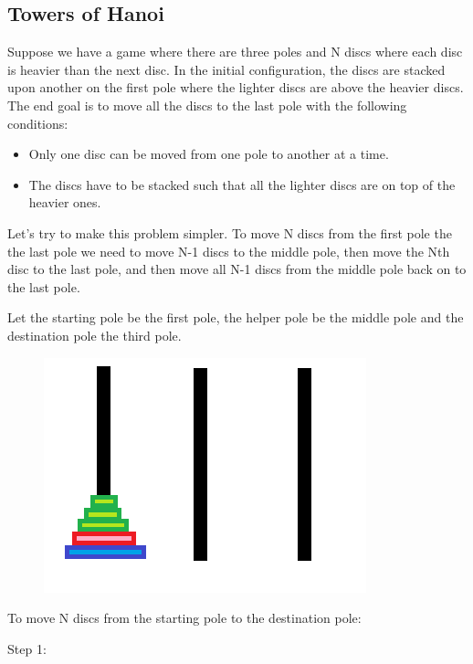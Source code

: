 \documentclass[11pt,oneside]{book}
\makeatletter
\def\maxwidth#1{\ifdim\Gin@nat@width>#1 #1\else\Gin@nat@width\fi}
\makeatother
\begin{document}
\subsection{Towers of Hanoi}

Suppose we have a game where there are three poles and N discs where each disc is heavier than the next disc. In the initial configuration, the discs are stacked upon another on the first pole where the lighter discs are above the heavier discs. The end goal is to move all the discs to the last pole with the following conditions:

\begin{itemize}
\item Only one disc can be moved from one pole to another at a time.
\item The discs have to be stacked such that all the lighter discs are on top of the heavier ones.
\end{itemize}

Let's try to make this problem simpler. To move N discs from the first pole the the last pole we need to move N-1 discs to the middle pole, then move the Nth disc to the last pole, and then move all N-1 discs from the middle pole back on to the last pole.

Let the starting pole be the first pole, the helper pole be the middle pole and the destination pole the third pole.

\vspace{5px}\begin{figure}[H]\centering
        \includegraphics[width=0.66\maxwidth{\textwidth}]{hanoi.png}
        \end{figure}

To move N discs from the starting pole to the destination pole:

Step 1:
\end{document}
